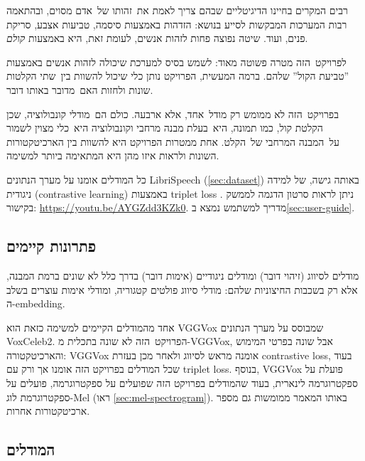 \documentclass[hebrew, a4paper]{article}
\theoremstyle{plain}
\theoremstyle{definition}
\numberwithin{equation}{section}
\begin{document}
רבים המקרים בחיינו הדיגיטליים שבהם צריך לאמת את~זהותו של~אדם מסוים,
ובהתאמה רבות המערכות המבקשות לסייע בנושא: הזדהות באמצעות סיסמה, טביעות
אצבע, סריקת פנים, ועוד. שיטה נפוצה פחות לזהות אנשים, לעומת זאת, היא
באמצעות \emph{קולם}.

לפרויקט~הזה מטרה פשוטה מאוד: לשמש בסיס למערכת שיכולה לזהות אנשים
באמצעות ”טביעת הקול” שלהם. ברמה המעשית, הפרויקט נותן כלי שיכול להשוות
בין~שתי הקלטות שונות ולחזות האם~מדובר באותו דובר.

בפרויקט~הזה לא ממומש רק מודל~אחד, אלא ארבעה. כולם הם~מודלי קונבולוציה,
שכן הקלטת קול, כמו תמונה, היא~בעלת מבנה מרחבי וקונבולוציה היא~כלי
מצוין לשמור על~המבנה המרחבי של~הקלט. אחת ממטרות הפרויקט היא להשוות בין
הארכיטקטורות השונות ולראות איזו מהן היא המתאימה ביותר למשימה.

כל המודלים אומנו על מערך הנתונים LibriSpeech (\autoref{sec:dataset})
באותה גישה, של למידה ניגודית (contrastive learning) באמצעות triplet
loss . ניתן לראות סרטון הדגמה לממשק בקישור:
\url{https://youtu.be/AYGZdd3KZk0}. מדריך למשתמש נמצא
ב\autoref{sec:user-guide}.

\subsection{פתרונות קיימים}
\label{sec:prior-art}

מודלים לסיווג (זיהוי דובר) ומודלים ניגודיים (אימות דובר) בדרך כלל לא
שונים ברמת המבנה, אלא רק בשכבות החיצוניות שלהם: מודלי סיווג פולטים
קטגוריה, ומודלי אימות עוצרים בשלב ה-embedding.

אחד מהמודלים הקיימים למשימה כזאת הוא VGGVox  שמבוסס
על מערך הנתונים VoxCeleb2. הפרויקט~הזה לא שונה בתכלית מ-VGGVox, אבל
שונה בפרטי המימוש והארכיטקטורה: VGGVox אומנה מראש לסיווג ולאחר מכן
בעזרת contrastive loss, בעוד שכל המודלים בפרויקט הזה אומנו אך ורק עם
triplet loss. בנוסף, VGGVox פועלת על ספקטרוגרמה לינארית, בעוד שהמודלים
בפרויקט הזה שפועלים על ספקטרוגרמה, פועלים על ספקטרוגרמת לוג-Mel (ראו
\autoref{sec:mel-spectrogram}). באותו המאמר ממומשות גם מספר
ארכיטקטורות אחרות.

\subsection{המודלים}
\label{sec:intro-models}
\end{document}
